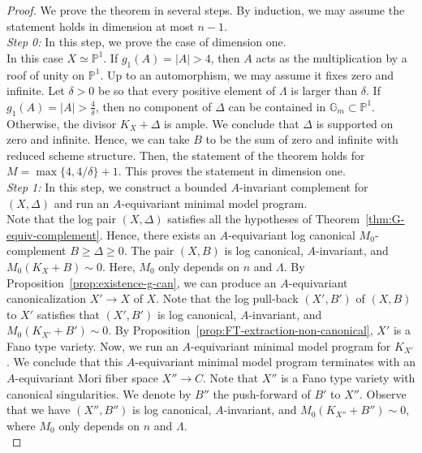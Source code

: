 \documentclass{amsart}
\newcommand{\pp}{\mathbb{P}}
\theoremstyle{remark}
\numberwithin{equation}{section}
\begin{document}
\begin{proof}
We prove the theorem in several steps.
By induction, we may assume the statement holds in dimension at most $n-1$.\\

\textit{Step 0:} In this step, we prove the case of dimension one.\\

In this case $X\simeq \pp^1$.
If $g_1(A)=|A|>4$, then $A$ acts as the multiplication by a roof of unity on $\pp^1$.
Up to an automorphism, we may assume it fixes zero and infinite.
Let $\delta>0$ be so that every positive element
of $\Lambda$ is larger than $\delta$.
If $g_1(A)=|A|>\frac{4}{\delta}$, then
no component of $\Delta$ can be contained in $\mathbb{G}_m\subset \pp^1$.
Otherwise, the divisor $K_X+\Delta$ is ample.
We conclude that $\Delta$ is supported on zero
and infinite.
Hence, we can take $B$ to be the sum of zero and infinite with reduced scheme structure.
Then, the statement of the theorem holds for 
$M=\max\{4,4/\delta\}+1$.
This proves the statement in dimension one.\\


\textit{Step 1:} In this step, we construct a bounded $A$-invariant complement for $(X,\Delta)$ and
run an $A$-equivariant minimal model program.\\

Note that the log pair $(X,\Delta)$ satisfies all the hypotheses of Theorem~\ref{thm:G-equiv-complement}.
Hence, there exists an $A$-equivariant log canonical $M_0$-complement $B\geq \Delta\geq 0$.
The pair $(X,B)$ is log canonical, $A$-invariant,
and $M_0(K_X+B) \sim 0$. Here, $M_0$ only depends on $n$ and $\Lambda$.
By Proposition~\ref{prop:existence-g-can}, we can produce an $A$-equivariant canonicalization $X'\rightarrow X$ of $X$.
Note that the log pull-back $(X',B')$ of $(X,B)$ to $X'$ satisfies that $(X',B')$ is log canonical, $A$-invariant, and $M_0(K_{X'}+B')\sim 0$.
By Proposition~\ref{prop:FT-extraction-non-canonical}, 
$X'$ is a Fano type variety. 
Now, we run an $A$-equivariant minimal model program for $K_{X'}$.
We conclude that 
this $A$-equivariant minimal model program terminates with an $A$-equivariant Mori fiber space
$X''\rightarrow C$.
Note that $X''$ is a Fano type variety with canonical singularities.
We denote by $B''$ the push-forward of $B'$ to $X''$.
Observe that we have $(X'',B'')$ is log canonical, 
$A$-invariant, and $M_0(K_{X''}+B'')\sim 0$, 
where $M_0$ only depends on $n$ and $\Lambda$.\\


\end{proof}
\end{document}
